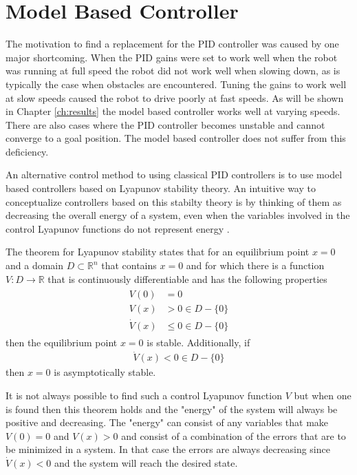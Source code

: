 \section{Model Based Controller}
\label{sec:lyapunov}
The motivation to find a replacement for the PID controller was caused by one major shortcoming. When the PID gains were set to work well when the robot was running at full speed the robot did not work well when slowing down, as is typically the case when obstacles are encountered. Tuning the gains to work well at slow speeds caused the robot to drive poorly at fast speeds. As will be shown in Chapter \ref{ch:results} the model based controller works well at varying speeds. There are also cases where the PID controller becomes unstable and cannot converge to a goal position. The model based controller does not suffer from this deficiency.

An alternative control method to using classical PID controllers is to use model based controllers based on Lyapunov stability theory. An intuitive way to conceptualize controllers based on this stabilty theory is by thinking of them as decreasing the overall energy of a system, even when the variables involved in the control Lyapunov functions do not represent energy \cite{Khalil02}.

The theorem for Lyapunov stability states that for an equilibrium point $x=0$ and a domain $D\subset\mathbb{R}^n$ that contains $x=0$ and for which there is a function $V:D\to\mathbb{R}$ that is continuously differentiable and has the following properties 
\begin{align}
\label{eq:lyapunovTheorem}
\begin{split}
V(0) &= 0 \\
V(x) &> 0 \in D-\{0\} \\
\dot{V}(x) &\leq 0 \in D-\{0\}
\end{split}
\end{align}
then the equilibrium point $x=0$ is stable. Additionally, if
\begin{align}
\label{eq:lyapunovAsymptoticStability}
\dot{V}(x) < 0 \in D - \{0\}
\end{align}
then $x=0$ is asymptotically stable.

It is not always possible to find such a control Lyapunov function $V$ but when one is found then this theorem holds and the "energy" of the system will always be positive and decreasing. The "energy" can consist of any variables that make $V(0) = 0$ and $V(x) > 0$ and consist of a combination of the errors that are to be minimized in a system. In that case the errors are always decreasing since $\dot{V}(x) < 0$ and the system will reach the desired state.

